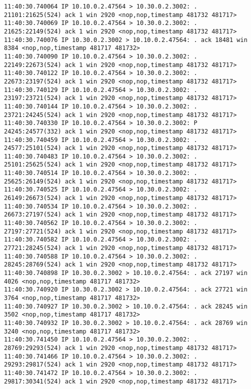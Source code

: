 \documentclass[a4paper,12pt]{article}
\begin{document}
\begin{lstlisting}
11:40:30.740064 IP 10.10.0.2.47564 > 10.30.0.2.3002: . 21101:21625(524) ack 1 win 2920 <nop,nop,timestamp 481732 481717>
11:40:30.740069 IP 10.10.0.2.47564 > 10.30.0.2.3002: . 21625:22149(524) ack 1 win 2920 <nop,nop,timestamp 481732 481717>
11:40:30.740076 IP 10.30.0.2.3002 > 10.10.0.2.47564: . ack 18481 win 8384 <nop,nop,timestamp 481717 481732>
11:40:30.740090 IP 10.10.0.2.47564 > 10.30.0.2.3002: . 22149:22673(524) ack 1 win 2920 <nop,nop,timestamp 481732 481717>
11:40:30.740122 IP 10.10.0.2.47564 > 10.30.0.2.3002: . 22673:23197(524) ack 1 win 2920 <nop,nop,timestamp 481732 481717>
11:40:30.740129 IP 10.10.0.2.47564 > 10.30.0.2.3002: . 23197:23721(524) ack 1 win 2920 <nop,nop,timestamp 481732 481717>
11:40:30.740144 IP 10.10.0.2.47564 > 10.30.0.2.3002: . 23721:24245(524) ack 1 win 2920 <nop,nop,timestamp 481732 481717>
11:40:30.740330 IP 10.10.0.2.47564 > 10.30.0.2.3002: P 24245:24577(332) ack 1 win 2920 <nop,nop,timestamp 481732 481717>
11:40:30.740459 IP 10.10.0.2.47564 > 10.30.0.2.3002: . 24577:25101(524) ack 1 win 2920 <nop,nop,timestamp 481732 481717>
11:40:30.740483 IP 10.10.0.2.47564 > 10.30.0.2.3002: . 25101:25625(524) ack 1 win 2920 <nop,nop,timestamp 481732 481717>
11:40:30.740514 IP 10.10.0.2.47564 > 10.30.0.2.3002: . 25625:26149(524) ack 1 win 2920 <nop,nop,timestamp 481732 481717>
11:40:30.740525 IP 10.10.0.2.47564 > 10.30.0.2.3002: . 26149:26673(524) ack 1 win 2920 <nop,nop,timestamp 481732 481717>
11:40:30.740534 IP 10.10.0.2.47564 > 10.30.0.2.3002: . 26673:27197(524) ack 1 win 2920 <nop,nop,timestamp 481732 481717>
11:40:30.740562 IP 10.10.0.2.47564 > 10.30.0.2.3002: . 27197:27721(524) ack 1 win 2920 <nop,nop,timestamp 481732 481717>
11:40:30.740582 IP 10.10.0.2.47564 > 10.30.0.2.3002: . 27721:28245(524) ack 1 win 2920 <nop,nop,timestamp 481732 481717>
11:40:30.740588 IP 10.10.0.2.47564 > 10.30.0.2.3002: . 28245:28769(524) ack 1 win 2920 <nop,nop,timestamp 481732 481717>
11:40:30.740898 IP 10.30.0.2.3002 > 10.10.0.2.47564: . ack 27197 win 4026 <nop,nop,timestamp 481717 481732>
11:40:30.740920 IP 10.30.0.2.3002 > 10.10.0.2.47564: . ack 27721 win 3764 <nop,nop,timestamp 481717 481732>
11:40:30.740927 IP 10.30.0.2.3002 > 10.10.0.2.47564: . ack 28245 win 3502 <nop,nop,timestamp 481717 481732>
11:40:30.740932 IP 10.30.0.2.3002 > 10.10.0.2.47564: . ack 28769 win 3240 <nop,nop,timestamp 481717 481732>
11:40:30.741450 IP 10.10.0.2.47564 > 10.30.0.2.3002: . 28769:29293(524) ack 1 win 2920 <nop,nop,timestamp 481732 481717>
11:40:30.741466 IP 10.10.0.2.47564 > 10.30.0.2.3002: . 29293:29817(524) ack 1 win 2920 <nop,nop,timestamp 481732 481717>
11:40:30.741472 IP 10.10.0.2.47564 > 10.30.0.2.3002: . 29817:30341(524) ack 1 win 2920 <nop,nop,timestamp 481732 481717>

\end{lstlisting}
\end{document}

